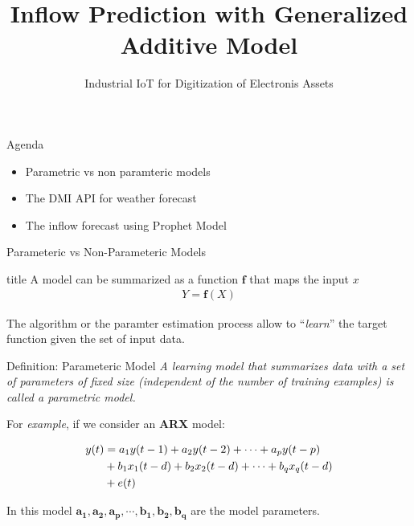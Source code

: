\documentclass[aspectratio=169,hyperref={pdfpagelabels=false}]{beamer}
\subtitle{\normalsize{Industrial IoT for Digitization of Electronis Assets}}
\title{Inflow Prediction with Generalized Additive Model}
\begin{document}
\inserttitlepage

\begin{frame}{Agenda}
  \begin{itemize}
    \item Parametric vs non paramteric models 
    \item The DMI API for weather forecast 
    \item The inflow forecast using Prophet Model 
  \end{itemize}
\end{frame}

\begin{frame}{Parameteric vs Non-Parameteric Models}
  \begin{block}{title}
    A model can be summarized as a function $\boldsymbol{f}$ that maps the input $x$
    \begin{align*}
      Y = \boldsymbol{f}(X)
    \end{align*}
  \end{block}
  The algorithm or the paramter estimation process allow to ``\textit{learn}'' the target function given the set of input data. 
\end{frame}

\begin{frame}
  \begin{block}{Definition: Parameteric Model}
    \textit{A learning model that summarizes data with a set of parameters of fixed size 
    (independent of the number of training examples) is called a parametric model.}
  \end{block}
  For \textit{example}, if we consider an \textbf{ARX} model: 
  \begin{center}
    \begin{tcolorbox}[width=0.8\linewidth, height = 0.25\linewidth]
      \begin{align*}\centering
        y(t) &= a_1 y(t-1) + a_2 y(t-2) + \cdots + a_p y(t-p) \\
        &+ b_1 x_1(t-d) + b_2 x_2(t-d) + \cdots + b_q x_q(t-d) \\
        &+ e(t)
      \end{align*}
  \end{tcolorbox}
  \end{center}

In this model $\boldsymbol{a_1}, \boldsymbol{a_2}, \boldsymbol{a_p},\cdots, \boldsymbol{b_1}, \boldsymbol{b_2}, \boldsymbol{b_q}$ are the model parameters.
\end{frame}
\end{document}
